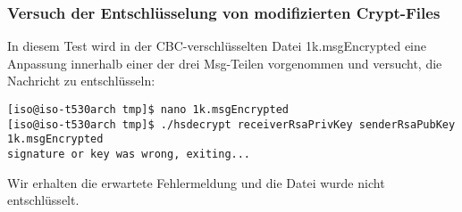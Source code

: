 \subsubsection{Versuch der Entschlüsselung von modifizierten Crypt-Files}
In diesem Test wird in der CBC-verschlüsselten Datei 1k.msgEncrypted eine Anpassung innerhalb einer der drei Msg-Teilen vorgenommen und versucht, die Nachricht zu entschlüsseln:

\begin{lstlisting}
[iso@iso-t530arch tmp]$ nano 1k.msgEncrypted 
[iso@iso-t530arch tmp]$ ./hsdecrypt receiverRsaPrivKey senderRsaPubKey 1k.msgEncrypted 
signature or key was wrong, exiting...
\end{lstlisting}

Wir erhalten die erwartete Fehlermeldung und die Datei wurde nicht entschlüsselt.

